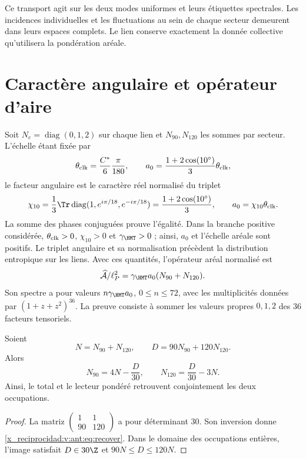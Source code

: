 Ce transport agit sur les deux modes uniformes et leurs étiquettes
spectrales. Les incidences individuelles et les fluctuations au sein de
chaque secteur demeurent dans leurs espaces complets. Le lien conserve
exactement la donnée collective qu'utilisera la pondération aréale.

\section{Caractère angulaire et opérateur d'aire}
\label{x_reciprocidad:v:ant:sec:ii-area-caracter}

Soit $N_e=\operatorname{diag}(0,1,2)$ sur chaque lien et
$N_{90},N_{120}$ les sommes par secteur. L'échelle étant fixée par
\[
\theta_{\rm clk}=\frac{C^*}{6}\frac{\pi}{180},\qquad
a_0=\frac{1+2\cos(10^\circ)}3\theta_{\rm clk},
\]
le facteur angulaire est le caractère réel normalisé du triplet
\begin{equation}
 \chi_{10}=\frac13\Tr\operatorname{diag}
       (1,e^{i\pi/18},e^{-i\pi/18})
 =\frac{1+2\cos(10^\circ)}3,
 \qquad a_0=\chi_{10}\theta_{\rm clk}.
 \label{x_reciprocidad:v:ant:eq:ii-area-caracter-triplete}
\end{equation}
La somme des phases conjuguées prouve l'égalité. Dans la branche positive
considérée, \(\theta_{\rm clk}>0\), \(\chi_{10}>0\) et
\(\gamma_{\HMT}>0\) ; ainsi, \(a_0\) et l'échelle aréale sont
positifs. Le triplet angulaire et sa normalisation précèdent la
distribution entropique sur les liens. Avec ces quantités,
l'opérateur aréal normalisé est
\[
\widehat{\mathcal A}/\ell_P^2
=\gamma_{\HMT}a_0(N_{90}+N_{120}).
\]
Son spectre a pour valeurs $n\gamma_{\HMT}a_0$, $0\le n\le72$,
avec les multiplicités données par $(1+z+z^2)^{36}$.
La preuve consiste à sommer les valeurs propres $0,1,2$ des
36 facteurs tensoriels.

\begin{theorem}
Soient
\[
N=N_{90}+N_{120},\qquad D=90N_{90}+120N_{120}.
\]
Alors
\begin{equation}
N_{90}=4N-\frac D{30},\qquad
N_{120}=\frac D{30}-3N.
\label{x_reciprocidad:v:ant:eq:recover}
\end{equation}
Ainsi, le total et le lecteur pondéré retrouvent conjointement
les deux occupations.
\end{theorem}
\begin{proof}
La matriz $\left(\begin{smallmatrix}1&1\\90&120\end{smallmatrix}\right)$
a pour déterminant $30$. Son inversion donne \eqref{x_reciprocidad:v:ant:eq:recover}.
Dans le domaine des occupations entières, l'image satisfait
$D\in30\Z$ et $90N\le D\le120N$.
\end{proof}

